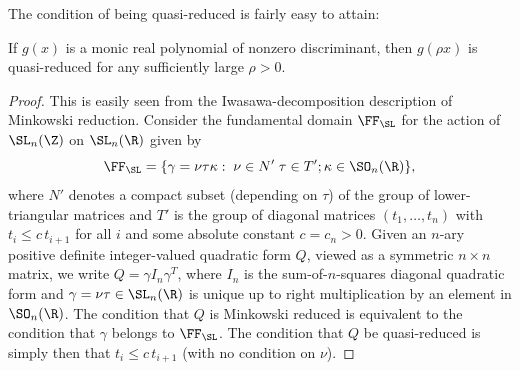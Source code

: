 The condition of being quasi-reduced
is fairly easy to attain:

\begin{lemma}
\notready\label{quasilemma}
If $g(x)$ is a monic real polynomial of nonzero discriminant, then
$g(\rho x)$ is quasi-reduced for any sufficiently large $\rho>0$.
\end{lemma}

\begin{proof}
This is easily seen from the Iwasawa-decomposition description of
Minkowski reduction. Consider the fundamental domain $\FF_\SL$ for
the action of $\SL_n(\Z)$ on $\SL_n(\R)$ given by
\begin{equation*}
\FF_\SL=\{\gamma=\nu \tau \kappa:\;\nu\in N'\;\tau\in T';\kappa\in\SO_n(\R)\},
\end{equation*}
where $N'$ denotes a compact subset (depending on $\tau$) of the group
of lower-triangular matrices and $T'$ is the group of diagonal
matrices $(t_1,\ldots,t_n)$ with $t_i\leq c\,t_{i+1}$ for all $i$ and
some absolute constant $c=c_n>0$.  Given an $n$-ary positive definite
integer-valued quadratic form $Q$, viewed as a symmetric $n\times n$
matrix, we write $Q=\gamma I_n \gamma^T$, where $I_n$ is the
sum-of-$n$-squares diagonal quadratic form and
$\gamma=\nu\tau\in\SL_n(\R)$ is unique up to right multiplication by
an element in $\SO_n(\R)$. The condition that $Q$ is Minkowski reduced
is equivalent to the condition that $\gamma$ belongs to $\FF_\SL$.
The condition that $Q$ be quasi-reduced is simply then that $t_i\leq
c\,t_{i+1}$ (with no condition on $\nu$).




\end{proof}
